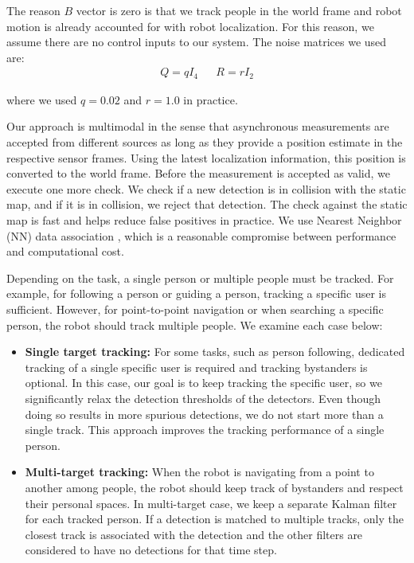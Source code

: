 The reason $B$ vector is zero is that we track people in the world frame and robot motion is already accounted for with robot localization. For this reason, we assume there are no control inputs to our system. The noise matrices we used are:
\begin{align}
Q=qI_4
&&
R=rI_2
\end{align}

where we used $q=0.02$ and $r=1.0$ in practice.

Our approach is multimodal in the sense that asynchronous measurements are accepted from different sources as long as they provide a position estimate in the respective sensor frames. Using the latest localization information, this position is converted to the world frame. Before the measurement is accepted as valid, we execute one more check. We check if a new detection is in collision with the static map, and if it is in collision, we reject that detection. The check against the static map is fast and helps reduce false positives in practice. We use Nearest Neighbor (NN) data association \cite{bar1995multitarget}, which is a reasonable compromise between performance and computational cost. 

Depending on the task, a single person or multiple people must be tracked. For example, for following a person or guiding a person, tracking a specific user is sufficient. However, for point-to-point navigation or when searching a specific person, the robot should track multiple people. We examine each case below:

\begin{itemize}
\item \textbf{Single target tracking:} For some tasks, such as person following, dedicated tracking of a single specific user is required and tracking bystanders is optional. In this case, our goal is to keep tracking the specific user, so we significantly relax the detection thresholds of the detectors. Even though doing so results in more spurious detections, we do not start more than a single track. This approach improves the tracking performance of a single person.
\item \textbf{Multi-target tracking:} When the robot is navigating from a point to another among people, the robot should keep track of bystanders and respect their personal spaces. In multi-target case, we keep a separate Kalman filter for each tracked person. If a detection is matched to multiple tracks, only the closest track is associated with the detection and the other filters are considered to have no detections for that time step.
\end{itemize}


